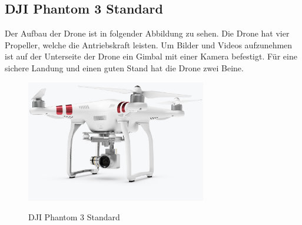 \subsection{DJI Phantom 3 Standard}\label{subsec: Phantom 3}
Der Aufbau der Drone ist in folgender Abbildung zu sehen. Die Drone hat vier Propeller, welche die Antriebskraft leisten. Um Bilder und Videos aufzunehmen ist auf der Unterseite der Drone ein Gimbal mit einer Kamera befestigt. Für eine sichere Landung und einen guten Stand hat die Drone zwei Beine.
\newline
\begin{figure}[H]
	\begin{center}
		{\includegraphics[width=0.7\textwidth]{images/DJI_Phantom_3_Standard.jpg}}
		\caption{DJI Phantom 3 Standard}
	\end{center}
\end{figure}

